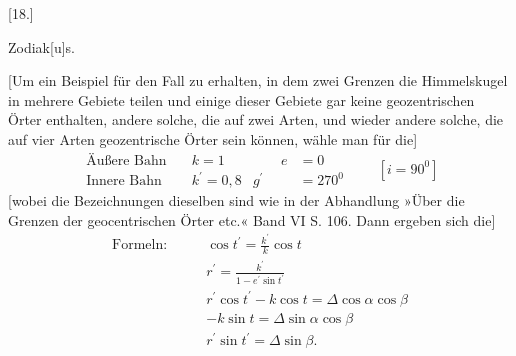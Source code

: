 \begin{center}
[18.]

Zodiak[u]s.
\end{center}

[Um ein Beispiel für den Fall zu erhalten, in dem zwei Grenzen die Himmelskugel in mehrere Gebiete teilen und einige dieser Gebiete gar keine geozentrischen Örter enthalten, andere solche, die auf zwei Arten, und wieder andere solche, die auf vier Arten geozentrische Örter sein können, wähle man für die]
\[
\begin{aligned}
\text{Äußere Bahn}\quad &k=1&\qquad e&=0\\
\text{Innere Bahn}\quad &k^{\prime}=0{,}8&g^{\prime}&=270^{0}
\end{aligned}
\qquad [i=90^{0}]
\]
[wobei die Bezeichnungen dieselben sind wie in der Abhandlung »Über die Grenzen der geocentrischen Örter etc.« Band VI S. 106. Dann ergeben sich die]
\[
\begin{aligned}
\text{Formeln:}\qquad &\cos t^{\prime}=\frac{k^{\prime}}{k}\cos t\\[5pt]
&r^{\prime}=\frac{k^{\prime}}{1-e^{\prime}\sin t^{\prime}}\\[5pt]
&r^{\prime}\cos t^{\prime}-k\cos t=\Delta\cos\alpha\cos\beta\\[5pt]
&-k\sin t=\Delta\sin\alpha\cos\beta\\[5pt]
&r^{\prime}\sin t^{\prime}=\Delta\sin\beta.
\end{aligned}
\]

